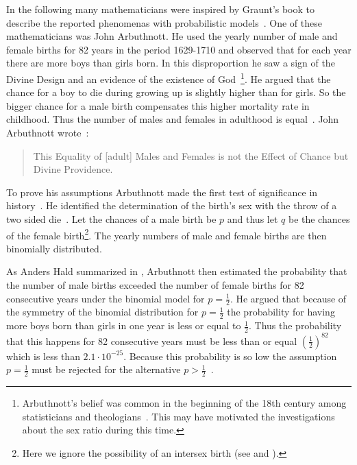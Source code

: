 In the following many mathematicians were inspired by Graunt's book to describe the reported phenomenas with probabilistic models~\cite[p. 275]{hald1}. One of these mathematicians was John Arbuthnott. He used the yearly number of male and female births for 82 years in the period 1629-1710 and observed that for each year there are more boys than girls born. In this disproportion he saw a sign of the Divine Design and an evidence of the existence of God~\cite[p. 277]{hald1}\footnote{Arbuthnott's belief was common in the beginning of the 18th century among statisticians and theologians~\cite[p.~285]{hald1}. This may have motivated the investigations about the sex ratio during this time.}. He argued that the chance for a boy to die during growing up is slightly higher than for girls. So the bigger chance for a male birth compensates this higher mortality rate in childhood. Thus the number of males and females in adulthood is equal~\cite[p. 277]{hald1}. John Arbuthnott wrote~\cite[p. 275]{hald1}:

\begin{quotation}
    This Equality of [adult] Males and Females is not the Effect of Chance but Divine Providence.
\end{quotation}

To prove his assumptions Arbuthnott made the first test of significance in history~\cite[p. 276]{hald1}. He identified the determination of the birth's sex with the throw of a two sided die~\cite[pp. 275-276]{hald1}. Let the chances of a male birth be $p$ and thus let $q$ be the chances of the female birth\footnote{Here we ignore the possibility of an intersex birth (see \cite{wiki:intersex} and \cite{wiki:transgender}).}. The yearly numbers of male and female births are then binomially distributed.

As Anders Hald summarized in \cite[p. 278]{hald1}, Arbuthnott then estimated the probability that the number of male births exceeded the number of female births for 82 consecutive years under the binomial model for $p=\tfrac 12$. He argued that because of the symmetry of the binomial distribution for $p=\tfrac 12$ the probability for having more boys born than girls in one year is less or equal to $\tfrac 12$. Thus the probability that this happens for 82 consecutive years must be less than or equal $\left(\tfrac 12\right)^{82}$ which is less than $2.1\cdot 10^{-25}$. Because this probability is so low the assumption $p=\tfrac 12$ must be rejected for the alternative $p > \tfrac 12$~\cite[p. 278]{hald1}.

